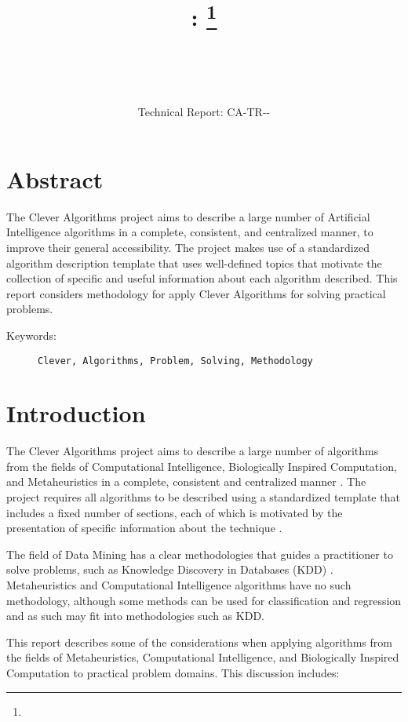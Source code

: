 \documentclass[a4paper, 11pt]{article}
\title{{\myreporttitle}: {\myreportsubtitle}\footnote{\myreportlicense}}
\author{\myreportauthor\\{\myreportemail}\\\small\myreportproject}
\date{\myreportfulldate\\{\small{Technical Report: CA-TR-{\myreportdate}-\myreportversion}}}
\begin{document}
\maketitle

\section*{Abstract} 
The Clever Algorithms project aims to describe a large number of Artificial Intelligence algorithms in a complete, consistent, and centralized manner, to improve their general accessibility. 
The project makes use of a standardized algorithm description template that uses well-defined topics that motivate the collection of specific and useful information about each algorithm described.
This report considers methodology for apply Clever Algorithms for solving practical problems.

\begin{description}
	\item[Keywords:] {\small\texttt{Clever, Algorithms, Problem, Solving, Methodology}}
\end{description} 

\section{Introduction}
\label{sec:introduction}
The Clever Algorithms project aims to describe a large number of algorithms from the fields of Computational Intelligence, Biologically Inspired Computation, and Metaheuristics in a complete, consistent and centralized manner \cite{Brownlee2010}.
The project requires all algorithms to be described using a standardized template that includes a fixed number of sections, each of which is motivated by the presentation of specific information about the technique \cite{Brownlee2010a}.

The field of Data Mining has a clear methodologies that guides a practitioner to solve problems, such as Knowledge Discovery in Databases (KDD) \cite{Fayyad1996}. Metaheuristics and Computational Intelligence algorithms have no such methodology, although some methods can be used for classification and regression and as such may fit into methodologies such as KDD.

This report describes some of the considerations when applying algorithms from the fields of Metaheuristics, Computational Intelligence, and Biologically Inspired Computation to practical problem domains. This discussion includes:
\end{document}
